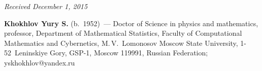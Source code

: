 \vspace*{-3pt}

\hfill{\small\textit{Received December 1, 2015}}


\Contrl

\noindent
\textbf{Khokhlov Yury S.} (b.\ 1952)~---
Doctor of Science in physics and mathematics, professor, Department of Mathematical 
Statistics, Faculty of Computational Mathematics and Cybernetics, 
M.\,V.~Lomonosov Moscow State University, 1-52~Leninskiye Gory, GSP-1, Moscow 119991, 
Russian Federation; \mbox{yskhokhlov@yandex.ru}


\label{end\stat}


\renewcommand{\bibname}{\protect\rm Литература}